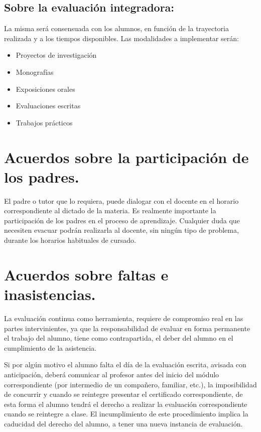 \documentclass[../main]{subfiles}
\begin{document}
\subsection{Sobre la evaluación integradora:}
La misma será consensuada con los alumnos, en función de la trayectoria realizada y a los tiempos disponibles. Las modalidades a implementar serán:  
\begin{itemize}
    
\item Proyectos de investigación 

\item Monografías 

\item Exposiciones orales 

\item Evaluaciones escritas 

\item Trabajos prácticos 

 
\end{itemize}

\section{Acuerdos sobre la participación de los padres. }

El padre o tutor que lo requiera, puede dialogar con el docente en el horario correspondiente al dictado de la materia. Es realmente importante la participación de los padres en el proceso de aprendizaje. Cualquier duda que necesiten evacuar podrán realizarla al docente, sin ningún tipo de problema, durante los horarios habituales de cursado. 

 

\section{Acuerdos sobre faltas e inasistencias.}

La evaluación continua como herramienta, requiere de compromiso real en las partes intervinientes, ya que la responsabilidad de evaluar en forma permanente el trabajo del alumno, tiene como contrapartida, el deber del alumno en el cumplimiento de la asistencia.  

Si por algún motivo el alumno falta el día de la evaluación escrita, avisada con anticipación, deberá comunicar al profesor antes del inicio del módulo correspondiente (por intermedio de un compañero, familiar, etc.), la imposibilidad de concurrir y cuando se reintegre presentar el certificado correspondiente, de esta forma el alumno tendrá el derecho a realizar la evaluación correspondiente cuando se reintegre a clase. El incumplimiento de este procedimiento implica la caducidad del derecho del alumno, a tener una nueva instancia de evaluación. 
\end{document}
